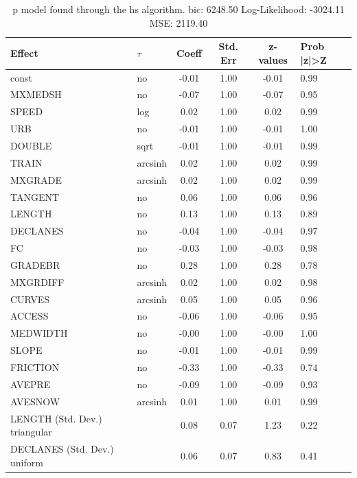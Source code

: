 \begin{table}
	\caption{p model found through the hs algorithm. bic: 6248.50 Log-Likelihood: -3024.11 MSE: 2119.40}
	\begin{center}
		\begin{tabular}{|l|l|c|c|c|l|}
			\hline
			Effect & $\tau$ & Coeff & Std. Err & z-values & Prob |z|>Z \\
			\hline
			const & no & -0.01 & 1.00 & -0.01 & 0.99 \\
			\hline
			MXMEDSH & no & -0.07 & 1.00 & -0.07 & 0.95 \\
			\hline
			SPEED & log & 0.02 & 1.00 & 0.02 & 0.99 \\
			\hline
			URB & no & -0.01 & 1.00 & -0.01 & 1.00 \\
			\hline
			DOUBLE & sqrt & -0.01 & 1.00 & -0.01 & 0.99 \\
			\hline
			TRAIN & arcsinh & 0.02 & 1.00 & 0.02 & 0.99 \\
			\hline
			MXGRADE & arcsinh & 0.02 & 1.00 & 0.02 & 0.99 \\
			\hline
			TANGENT & no & 0.06 & 1.00 & 0.06 & 0.96 \\
			\hline
			LENGTH & no & 0.13 & 1.00 & 0.13 & 0.89 \\
			\hline
			DECLANES & no & -0.04 & 1.00 & -0.04 & 0.97 \\
			\hline
			FC & no & -0.03 & 1.00 & -0.03 & 0.98 \\
			\hline
			GRADEBR & no & 0.28 & 1.00 & 0.28 & 0.78 \\
			\hline
			MXGRDIFF & arcsinh & 0.02 & 1.00 & 0.02 & 0.98 \\
			\hline
			CURVES & arcsinh & 0.05 & 1.00 & 0.05 & 0.96 \\
			\hline
			ACCESS & no & -0.06 & 1.00 & -0.06 & 0.95 \\
			\hline
			MEDWIDTH & no & -0.00 & 1.00 & -0.00 & 1.00 \\
			\hline
			SLOPE & no & -0.01 & 1.00 & -0.01 & 0.99 \\
			\hline
			FRICTION & no & -0.33 & 1.00 & -0.33 & 0.74 \\
			\hline
			AVEPRE & no & -0.09 & 1.00 & -0.09 & 0.93 \\
			\hline
			AVESNOW & arcsinh & 0.01 & 1.00 & 0.01 & 0.99 \\
			\hline
			LENGTH (Std. Dev.) triangular &  & 0.08 & 0.07 & 1.23 & 0.22 \\
			\hline
			DECLANES (Std. Dev.) uniform &  & 0.06 & 0.07 & 0.83 & 0.41 \\

\end{tabular}
\end{center}
\end{table}
